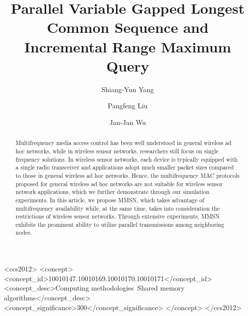 \documentclass[format=acmsmall, review=false, screen=true]{acmart}
\begin{document}
\title[Parallel VGLCS and IRMQ]{Parallel Variable Gapped Longest Common Sequence and Incremental Range Maximum Query}  
\author{Shiang-Yun Yang}
\author{Pangfeng Liu}
\author{Jan-Jan Wu}

\begin{abstract}
Multifrequency media access control has been well understood in
general wireless ad hoc networks, while in wireless sensor networks,
researchers still focus on single frequency solutions. In wireless
sensor networks, each device is typically equipped with a single
radio transceiver and applications adopt much smaller packet sizes
compared to those in general wireless ad hoc networks. Hence, the
multifrequency MAC protocols proposed for general wireless ad hoc
networks are not suitable for wireless sensor network applications,
which we further demonstrate through our simulation experiments. In
this article, we propose MMSN, which takes advantage of
multifrequency availability while, at the same time, takes into
consideration the restrictions of wireless sensor networks. Through
extensive experiments, MMSN exhibits the prominent ability to utilize
parallel transmissions among neighboring nodes. 
\end{abstract}


%
%
\begin{CCSXML}
<ccs2012>
<concept>
<concept_id>10010147.10010169.10010170.10010171</concept_id>
<concept_desc>Computing methodologies~Shared memory algorithms</concept_desc>
<concept_significance>300</concept_significance>
</concept>
</ccs2012>
\end{CCSXML}


%
%


\end{document}
